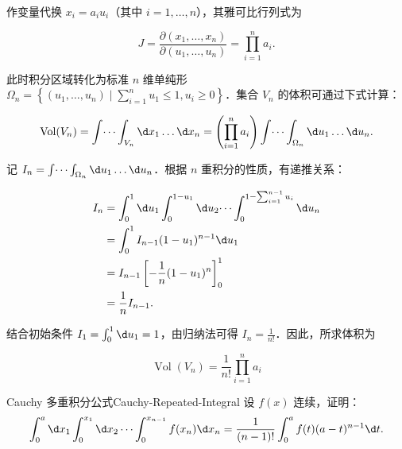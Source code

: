 \begin{solution}
    作变量代换 $x_i = a_i u_i$（其中 $i = 1, \dots, n$），其雅可比行列式为

    \begin{equation}
        J = \frac{\partial(x_1, \dots, x_n)}{\partial(u_1, \dots, u_n)} = \prod_{i=1}^n a_i.
    \end{equation}

    此时积分区域转化为标准 $n$ 维单纯形 $\Omega_n = \left\{ (u_1, \dots, u_n) \mid \sum_{i=1}^n u_1 \leqslant 1, u_i \geqslant 0 \right\}$．集合 $V_n$ 的体积可通过下式计算：

    \begin{equation}
        \operatorname{Vol}(V_n) = \int \dots \int_{V_n} \d x_1 \dots \d x_n = \left( \prod_{i=1}^n a_i \right) \int \dots \int_{\Omega_n} \d u_1 \dots \d u_n.
    \end{equation}

    记 $I_n = \int \dots \int_{\Omega_n} \d u_1 \dots \d u_n$．根据 $n$ 重积分的性质，有递推关系：

    \begin{equation}
        \begin{aligned}
            I_n & = \int_0^1 \d u_1 \int_0^{1-u_1} \d u_2 \dots \int_0^{1-\sum_{i=1}^{n-1} u_i} \d u_n \\
                & = \int_0^1 I_{n-1}(1-u_1)^{n-1} \d u_1                                               \\
                & = I_{n-1} \left[ -\frac{1}{n} (1-u_1)^n \right]_0^1                                  \\
                & = \frac{1}{n} I_{n-1}.
        \end{aligned}
    \end{equation}

    结合初始条件 $I_1 = \int_0^1 \d u_1 = 1$，由归纳法可得 $I_n = \frac{1}{n!}$．因此，所求体积为

    \begin{equation}
        \boxed{\operatorname{Vol}(V_n) = \frac{1}{n!} \prod_{i=1}^n a_i}
    \end{equation}
\end{solution}

\begin{problem}{Cauchy 多重积分公式}{Cauchy-Repeated-Integral}
    设 $f(x)$ 连续，证明：
    \begin{equation}
        \int_{0}^{a} \d x_1 \int_{0}^{x_1} \d x_2 \cdots \int_{0}^{x_{n-1}} f(x_n) \d x_n = \frac{1}{(n-1)!} \int_{0}^{a} f(t)(a-t)^{n-1} \d t.
    \end{equation}
\end{problem}

